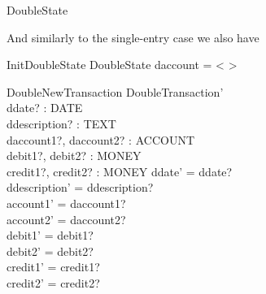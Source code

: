 \documentclass[11pt]{amsart}
\begin{document}
\begin{zed}
DoubleState 
\end{zed}

And similarly to the single-entry case we also have

\begin{schema}{InitDoubleState}
DoubleState
\where
daccount = < >
\end{schema}

\begin{schema}{DoubleNewTransaction}
DoubleTransaction'\\
ddate? : DATE\\
ddescription? : TEXT\\
daccount1?, daccount2? : ACCOUNT\\ 
debit1?, debit2? : MONEY\\
credit1?, credit2? : MONEY
\where
ddate' = ddate?\\
ddescription' = ddescription?\\
account1' = daccount1?\\
account2' = daccount2?\\
debit1' = debit1?\\
debit2' = debit2?\\
credit1' = credit1?\\
credit2' = credit2?
\end{schema}

%
\end{document}
